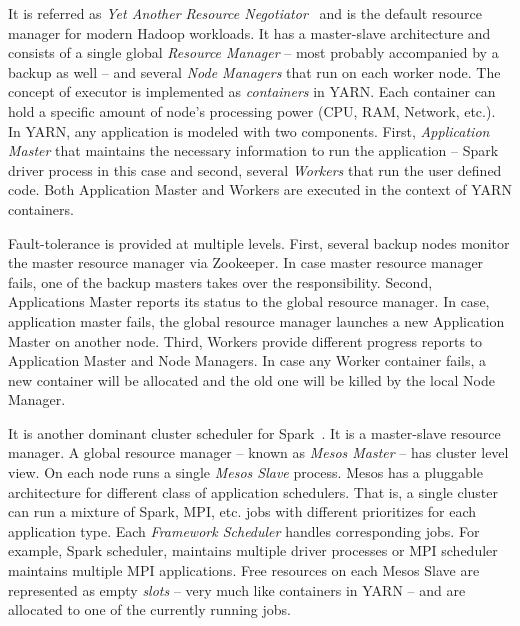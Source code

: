 \begin{description}[leftmargin=0pt]
    \item [Apache YARN] It is referred as \emph{Yet Another Resource Negotiator}~\cite{Vavilapalli:2013} and is the default resource manager for modern Hadoop workloads. It has a master-slave architecture and consists of a single global \emph{Resource Manager} -- most probably accompanied by a backup as well --  and several \emph{Node Managers} that run on each worker node. The concept of executor is implemented as \emph{containers} in YARN. Each container can hold a specific amount of node's processing power (CPU, RAM, Network, etc.). In YARN, any application is modeled with two components. First, \emph{Application Master} that maintains the necessary information to run the application -- Spark driver process in this case and second, several \emph{Workers} that run the user defined code. Both Application Master and Workers are executed in the context of YARN containers. 
    
    Fault-tolerance is provided at multiple levels. First, several backup nodes monitor the master resource manager via Zookeeper. In case master resource manager fails, one of the backup masters takes over the responsibility. Second, Applications Master reports its status to the global resource manager. In case, application master fails, the global resource manager launches a new Application Master on another node. Third, Workers provide different progress reports to Application Master and Node Managers. In case any Worker container fails, a new container will be allocated and the old one will be killed by the local Node Manager.
    \item [Apache Mesos] It is another dominant cluster scheduler for Spark~\cite{Hindman:2011}. It is a master-slave resource manager. A global resource manager -- known as \emph{Mesos Master} -- has cluster level view. On each node runs a single \emph{Mesos Slave} process. Mesos has a pluggable architecture for different class of application schedulers. That is, a single cluster can run a mixture of Spark, MPI, etc. jobs with different prioritizes for each application type. Each \emph{Framework Scheduler} handles corresponding jobs. For example, Spark scheduler, maintains multiple driver processes or MPI scheduler maintains multiple MPI applications. Free resources on each Mesos Slave are represented as empty \emph{slots} -- very much like containers in YARN -- and are allocated to one of the currently running jobs.
    

\end{description}
